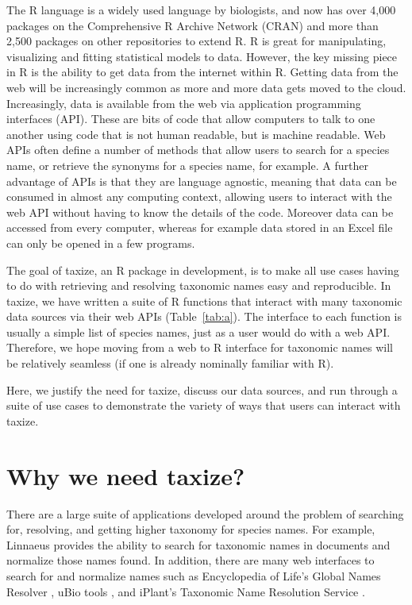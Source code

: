 \documentclass[10pt]{article}\usepackage[]{graphicx}\usepackage[]{color}
\begin{document}
The R language is a widely used language by biologists, and now has over 4,000 packages on the Comprehensive R Archive Network (CRAN) and more than 2,500 packages on other repositories to extend R. R is great for manipulating, visualizing and fitting statistical models to data. However, the key missing piece in R is the ability to get data from the internet within R. Getting data from the web will be increasingly common as more and more data gets moved to the cloud. Increasingly, data is available from the web via application programming interfaces (API). These are bits of code that allow computers to talk to one another using code that is not human readable, but is machine readable. Web APIs often define a number of methods that allow users to search for a species name, or retrieve the synonyms for a species name, for example. A further advantage of APIs is that they are language agnostic, meaning that data can be consumed in almost any computing context, allowing users to interact with the web API without having to know the details of the code. Moreover data can be accessed from every computer, whereas for example data stored in an Excel file can only be opened in a few programs. 

The goal of taxize, an R package in development, is to make all use cases having to do with retrieving and resolving taxonomic names easy and reproducible. In taxize, we have written a suite of R functions that interact with many taxonomic data sources via their web APIs (Table~\ref{tab:a}). The interface to each function is usually a simple list of species names, just as a user would do with a web API. Therefore, we hope moving from a web to R interface for taxonomic names will be relatively seamless (if one is already nominally familiar with R). 

Here, we justify the need for taxize, discuss our data sources, and run through a suite of use cases to demonstrate the variety of ways that users can interact with taxize. 


\section*{Why we need taxize?}

There are a large suite of applications developed around the problem of searching for, resolving, and getting higher taxonomy for species names. For example, Linnaeus \cite{linnaeus} provides the ability to search for taxonomic names in documents and normalize those names found. In addition, there are many web interfaces to search for and normalize names such as Encyclopedia of Life's Global Names Resolver \cite{eolgnr}, uBio tools \cite{ubio}, and iPlant's Taxonomic Name Resolution Service \cite{tnrs}. 
\end{document}
